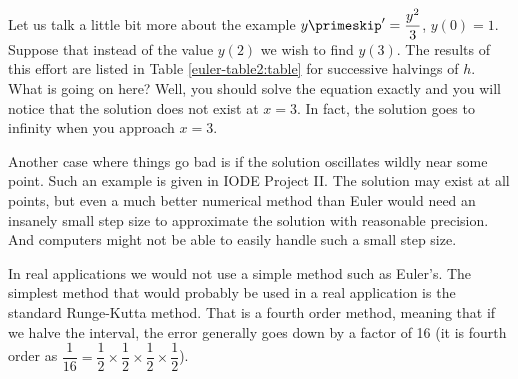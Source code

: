 \medskip

Let us talk a little bit more about the example
$y\primeskip' = \dfrac{y^2}{3}$, $y(0) =
1$.  Suppose that instead of the value $y(2)$ we wish to find $y(3)$.
The results of this effort are listed in Table
\ref{euler-table2:table} for successive halvings of $h$.  What is
going on here?  Well, you should solve the equation exactly and you will
notice that the solution does not exist at $x=3$.  In fact, the solution goes
to infinity when you approach $x=3$.


Another case where things go bad is if the solution oscillates wildly
near some point.
Such an example is given in IODE Project II.  The solution
may exist at all points, but even a much better numerical method than
Euler would need an insanely small step size to approximate the solution
with reasonable precision.
And computers might not be able to easily handle such a small step size.

\medskip

In real applications we would not use a simple method such as Euler's.  The
simplest method that would probably be used in a real application is the
standard Runge-Kutta method.  That is a
fourth order method,
meaning that if we halve the interval, the error generally
goes down by a factor of 16 (it is fourth order as $\dfrac{1}{16} =
\dfrac{1}{2} \times \dfrac{1}{2}
\times \dfrac{1}{2} \times \dfrac{1}{2}$).\\

